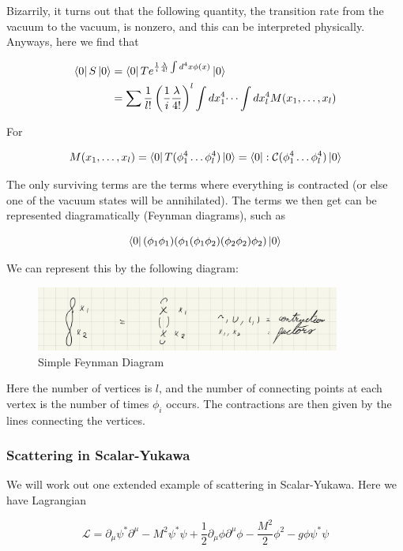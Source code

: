 \documentclass{article}
\theoremstyle{definition}
\begin{document}
Bizarrily, it turns out that the following quantity, the transition rate from
the vacuum to the vacuum, is nonzero, and this can be interpreted physically.
Anyways, here we find that

\begin{align*}
\bra{0} S \ket{0} &= \bra{0} Te^{\frac{1}{i} \frac{\lambda}{4!} \int d^4x \phi(x)} \ket{0} \\
&= \sum \frac{1}{l!} \left( \frac{1}{i} \frac{\lambda}{4!} \right)^l \int dx_1^4 \dots \int dx_l^4 M(x_1, \dots, x_l) \\
\end{align*}

For

$$ M(x_1, \dots, x_l) = \bra{0} T(\phi_1^4 \dots \phi_l^4) \ket{0} = \bra{0} :
\mathcal{C} (\phi_1^4 \dots \phi_l^4) \ket{0} $$

The only surviving terms are the terms where everything is contracted (or else
one of the vacuum states will be annihilated). The terms we then get can be
represented diagramatically (Feynman diagrams), such as 

$$ \bra{0} (\phi_1 \phi_1) (\phi_1 (\phi_1 \phi_2) (\phi_2 \phi_2) \phi_2)
\ket{0} $$

We can represent this by the following diagram:

\begin{figure}[H]
\centering
\includegraphics[width=10cm]{res/QFT/basic_feynman}
\caption{Simple Feynman Diagram}
\end{figure}

Here the number of vertices is $l$, and the number of connecting points at each
vertex is the number of times $\phi_i$ occurs. The contractions are then given
by the lines connecting the vertices.

\subsubsection{Scattering in Scalar-Yukawa}

We will work out one extended example of scattering in Scalar-Yukawa. Here we
have Lagrangian

$$ \mathcal{L} = \partial_\mu \psi^* \partial^\mu - M^2 \psi^* \psi +
\frac{1}{2} \partial_\mu \phi \partial^\mu \phi - \frac{M^2}{2} \phi^2 - g \phi
\psi^* \psi $$
\end{document}
